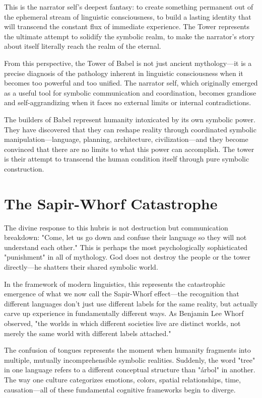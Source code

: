 This is the narrator self's deepest fantasy: to create something permanent out of the ephemeral stream of linguistic consciousness, to build a lasting identity that will transcend the constant flux of immediate experience. The Tower represents the ultimate attempt to solidify the symbolic realm, to make the narrator's story about itself literally reach the realm of the eternal.

From this perspective, the Tower of Babel is not just ancient mythology—it is a precise diagnosis of the pathology inherent in linguistic consciousness when it becomes too powerful and too unified. The narrator self, which originally emerged as a useful tool for symbolic communication and coordination, becomes grandiose and self-aggrandizing when it faces no external limits or internal contradictions.

The builders of Babel represent humanity intoxicated by its own symbolic power. They have discovered that they can reshape reality through coordinated symbolic manipulation—language, planning, architecture, civilization—and they become convinced that there are no limits to what this power can accomplish. The tower is their attempt to transcend the human condition itself through pure symbolic construction.

\section{The Sapir-Whorf Catastrophe}

The divine response to this hubris is not destruction but communication breakdown: "Come, let us go down and confuse their language so they will not understand each other." This is perhaps the most psychologically sophisticated "punishment" in all of mythology. God does not destroy the people or the tower directly—he shatters their shared symbolic world.

In the framework of modern linguistics, this represents the catastrophic emergence of what we now call the Sapir-Whorf effect—the recognition that different languages don't just use different labels for the same reality, but actually carve up experience in fundamentally different ways. As Benjamin Lee Whorf observed, "the worlds in which different societies live are distinct worlds, not merely the same world with different labels attached."

The confusion of tongues represents the moment when humanity fragments into multiple, mutually incomprehensible symbolic realities. Suddenly, the word "tree" in one language refers to a different conceptual structure than "árbol" in another. The way one culture categorizes emotions, colors, spatial relationships, time, causation—all of these fundamental cognitive frameworks begin to diverge.

